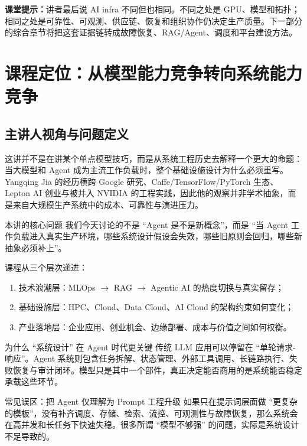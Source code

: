 \documentclass[a4paper]{article}
\begin{document}
\textbf{课堂提示：}讲者最后说 AI infra 不同但也相同。不同之处是 GPU、模型和拓扑；相同之处是可靠性、可观测、供应链、恢复和组织协作仍决定生产质量。下一部分的综合章节将把这套证据链转成故障恢复、RAG/Agent、调度和平台建设方法。

\section{课程定位：从模型能力竞争转向系统能力竞争}

\subsection{主讲人视角与问题定义}
这讲并不是在讲某个单点模型技巧，而是从系统工程历史去解释一个更大的命题：当大模型和 Agent 成为主流工作负载时，整个基础设施设计为什么必须重写。Yangqing Jia 的经历横跨 Google 研究、Caffe/TensorFlow/PyTorch 生态、Lepton AI 创业与被并入 NVIDIA 的工程实践，因此他的观察并非学术抽象，而是来自大规模生产系统中的成本、可靠性与演进压力。

\begin{importantbox}{本讲的核心问题}
我们今天讨论的不是 ``Agent 是不是新概念''，而是 ``当 Agent 工作负载进入真实生产环境，哪些系统设计假设会失效，哪些旧原则会回归，哪些新抽象必须补上''。
\end{importantbox}

课程从三个层次递进：
\begin{enumerate}
    \item 技术浪潮层：MLOps $\rightarrow$ RAG $\rightarrow$ Agentic AI 的热度切换与真实留存；
    \item 基础设施层：HPC、Cloud、Data Cloud、AI Cloud 的架构约束如何变化；
    \item 产业落地层：企业应用、创业机会、边缘部署、成本与价值之间如何权衡。
\end{enumerate}

\begin{knowledgebox}{为什么 ``系统设计'' 在 Agent 时代更关键}
传统 LLM 应用可以停留在 ``单轮请求-响应''。Agent 系统则包含任务拆解、状态管理、外部工具调用、长链路执行、失败恢复与审计闭环。模型只是其中一个部件，真正决定能否商用的是系统能否稳定承载这些环节。
\end{knowledgebox}

\begin{warningbox}{常见误区：把 Agent 仅理解为 Prompt 工程升级}
如果只在提示词层面做 ``更复杂的模板''，没有补齐调度、存储、检索、流控、可观测性与故障恢复，那么系统会在高并发和长任务下快速失稳。很多所谓 ``模型不够强'' 的问题，实际是系统设计不足导致的。
\end{warningbox}
\end{document}

